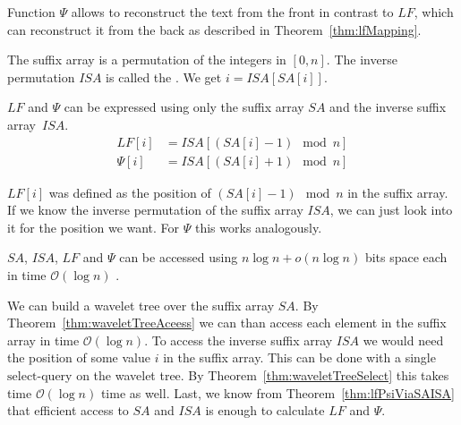 Function $\Psi$ allows to reconstruct the text from the front in contrast to $LF$, which can reconstruct it from the back as described in Theorem~\ref{thm:lfMapping}.

\begin{Definition}
  The suffix array is a permutation of the integers in $[0,n]$. The inverse permutation $ISA$ is called the . We get $i = ISA[SA[i]]$.
\end{Definition}

\begin{Theorem}
  \label{thm:lfPsiViaSAISA}
  $LF$ and $\Psi$ can be expressed using only the suffix array $SA$ and the inverse suffix array~$ISA$.
  \begin{align}
    LF[i] &= ISA[(SA[i] - 1) \mod n] \\
    \Psi[i] &= ISA[(SA[i] + 1) \mod n]
  \end{align}
\end{Theorem}

\begin{Proof}
  $LF[i]$ was defined as the position of $(SA[i] - 1) \mod n$ in the suffix array. If we know the inverse permutation of the suffix array $ISA$, we can just look into it for the position we want. For $\Psi$ this works analogously.
\end{Proof}

\begin{Theorem}
  $SA$, $ISA$, $LF$ and $\Psi$ can be accessed using $n \log n + o(n \log n)$ bits space each in time $\mathcal{O}(\log n)$ .
\end{Theorem}

\begin{Proof}
  We can build a wavelet tree over the suffix array $SA$. By Theorem~\ref{thm:waveletTreeAceess} we can than access each element in the suffix array in time $\mathcal{O}(\log n)$. To access the inverse suffix array $ISA$ we would need the position of some value $i$ in the suffix array. This can be done with a single $\mathrm{select}$-query on the wavelet tree. By Theorem~\ref{thm:waveletTreeSelect} this takes time $\mathcal{O}(\log n)$ time as well. Last, we know from Theorem~\ref{thm:lfPsiViaSAISA} that efficient access to $SA$ and $ISA$ is enough to calculate $LF$ and $\Psi$.
\end{Proof}

